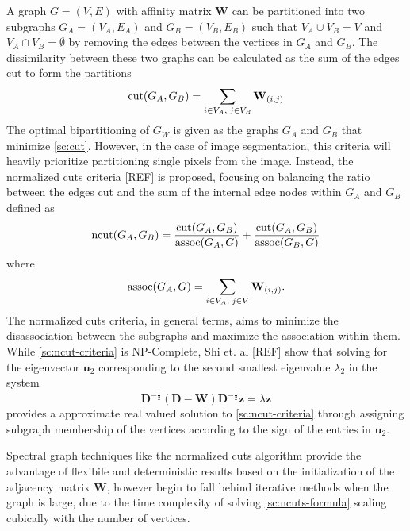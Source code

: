 A graph $G = (V,E)$ with affinity matrix $\mathbf{W}$ can be partitioned into two subgraphs $G_A = (V_A, E_A)$ and $G_B = (V_B, E_B)$ such that $V_A \cup V_B = V$ and $V_A \cap V_B = \emptyset$ by removing the edges between the vertices in $G_A$ and $G_B$. The dissimilarity between these two graphs can be calculated as the sum of the edges cut to form the partitions
\begin{equation}
    \label{sc:cut}
    \operatorname*{\text{cut}}(G_A,G_B) = \sum_{i \in V_A,\;j \in V_B}{\mathbf{W}_{(i,j)}}
\end{equation}
The optimal bipartitioning of $G_W$ is given as the graphs $G_A$ and $G_B$ that minimize \eqref{sc:cut}. However, in the case of image segmentation, this criteria will heavily prioritize partitioning single pixels from the image. Instead, the normalized cuts criteria [REF] is proposed, focusing on balancing the ratio between the edges cut and the sum of the internal edge nodes within $G_A$ and $G_B$ defined as 
\begin{equation}
    \label{sc:ncut-criteria}
    \operatorname*{\text{ncut}}(G_A, G_B) = \frac{\operatorname*{\text{cut}}(G_A, G_B)}{\operatorname*{\text{assoc}}(G_A, G)} + \frac{\operatorname*{\text{cut}}(G_A, G_B)}{\operatorname*{\text{assoc}}(G_B, G)}
\end{equation}
where 
\begin{equation}
    \label{sc:assoc}
    \operatorname*{\text{assoc}}(G_A, G) = \sum_{i \in V_A,\;j \in V}{\mathbf{W}_{(i,j)}}.
\end{equation}
The normalized cuts criteria, in general terms, aims to minimize the disassociation between the subgraphs and maximize the association within them. While \eqref{sc:ncut-criteria} is NP-Complete, Shi et. al [REF] show that solving for the eigenvector $\mathbf{u}_2$ corresponding to the second smallest eigenvalue $\lambda_2$ in the system
\begin{equation}
    \label{sc:ncuts-formula}
    \mathbf{D}^{-\frac{1}{2}}(\mathbf{D} - \mathbf{W})\mathbf{D}^{-\frac{1}{2}}\mathbf{z} = \lambda \mathbf{z}
\end{equation}
provides a approximate real valued solution to \eqref{sc:ncut-criteria} through assigning subgraph membership of the vertices according to the sign of the entries in $\mathbf{u}_2$.

Spectral graph techniques like the normalized cuts algorithm provide the advantage of flexibile and deterministic results based on the initialization of the adjacency matrix $\mathbf{W}$, however begin to fall behind iterative methods when the graph is large, due to the time complexity of solving \eqref{sc:ncuts-formula} scaling cubically with the number of vertices. 